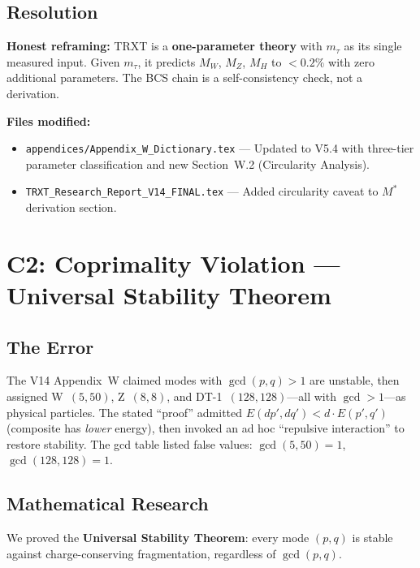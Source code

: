 \documentclass[11pt,a4paper]{article}
\begin{document}
\subsection{Resolution}
\begin{mdframed}[backgroundcolor=blue!5]
\textbf{Honest reframing:} TRXT is a \textbf{one-parameter theory} with $m_\tau$ as its single measured input.  Given $m_\tau$, it predicts $M_W$, $M_Z$, $M_H$ to $< 0.2\%$ with zero additional parameters.  The BCS chain is a self-consistency check, not a derivation.
\end{mdframed}

\textbf{Files modified:}
\begin{itemize}
    \item \texttt{appendices/Appendix\_W\_Dictionary.tex} --- Updated to V5.4 with three-tier parameter classification and new Section~W.2 (Circularity Analysis).
    \item \texttt{TRXT\_Research\_Report\_V14\_FINAL.tex} --- Added circularity caveat to $M^*$ derivation section.
\end{itemize}

\section{C2: Coprimality Violation --- Universal Stability Theorem}
\label{sec:C2}

\subsection{The Error}
The V14 Appendix~W claimed modes with $\gcd(p,q) > 1$ are unstable, then assigned W~$(5,50)$, Z~$(8,8)$, and DT-1~$(128,128)$---all with $\gcd > 1$---as physical particles.  The stated ``proof'' admitted $E(dp',dq') < d \cdot E(p',q')$ (composite has \emph{lower} energy), then invoked an ad hoc ``repulsive interaction'' to restore stability.  The gcd table listed false values: $\gcd(5,50) = 1$, $\gcd(128,128) = 1$.

\subsection{Mathematical Research}

We proved the \textbf{Universal Stability Theorem}: every mode $(p,q)$ is stable against charge-conserving fragmentation, regardless of $\gcd(p,q)$.
\end{document}
